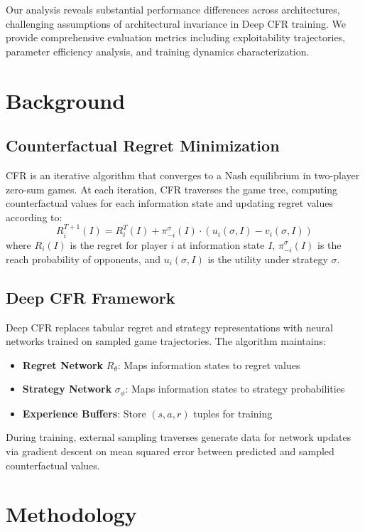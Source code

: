 \documentclass{article}
\begin{document}
Our analysis reveals substantial performance differences across architectures, challenging assumptions of architectural invariance in Deep CFR training. We provide comprehensive evaluation metrics including exploitability trajectories, parameter efficiency analysis, and training dynamics characterization.

\section{Background}

\subsection{Counterfactual Regret Minimization}

CFR is an iterative algorithm that converges to a Nash equilibrium in two-player zero-sum games. At each iteration, CFR traverses the game tree, computing counterfactual values for each information state and updating regret values according to:
\[
R_i^{T+1}(I) = R_i^T(I) + \pi_{-i}^{\sigma}(I) \cdot (u_i(\sigma, I) - v_i(\sigma, I))
\]
where $R_i(I)$ is the regret for player $i$ at information state $I$, $\pi_{-i}^{\sigma}(I)$ is the reach probability of opponents, and $u_i(\sigma, I)$ is the utility under strategy $\sigma$.

\subsection{Deep CFR Framework}

Deep CFR replaces tabular regret and strategy representations with neural networks trained on sampled game trajectories. The algorithm maintains:

\begin{itemize}
\item \textbf{Regret Network} $R_\theta$: Maps information states to regret values
\item \textbf{Strategy Network} $\sigma_\phi$: Maps information states to strategy probabilities
\item \textbf{Experience Buffers}: Store $(s, a, r)$ tuples for training
\end{itemize}

During training, external sampling traverses generate data for network updates via gradient descent on mean squared error between predicted and sampled counterfactual values.

\section{Methodology}
\end{document}
